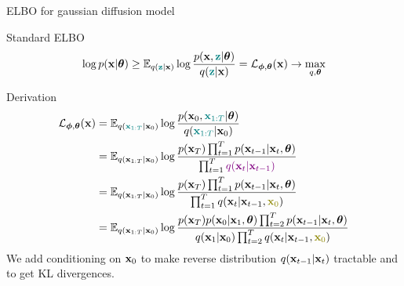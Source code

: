 \begin{frame}{ELBO for gaussian diffusion model}
	\begin{block}{Standard ELBO}
		\vspace{-0.4cm}
		\[
			\log p(\mathbf{x} | \boldsymbol{\theta}) \geq \mathbb{E}_{q({\color{teal}\mathbf{z}} | \mathbf{x})} \log \frac{p(\mathbf{x}, {\color{teal}\mathbf{z}} | \boldsymbol{\theta})}{q({\color{teal}\mathbf{z}} | \mathbf{x})} = \mathcal{L}_{\boldsymbol{\phi}, \boldsymbol{\theta}}(\mathbf{x}) \rightarrow \max_{q, \boldsymbol{\theta}}
		\]
		\vspace{-0.5cm}
	\end{block}
	\begin{block}{Derivation}
		\vspace{-0.5cm}
		{\small
		\begin{align*}
			\cL_{\bphi, \btheta}(\bx) &= \bbE_{q({\color{teal}\bx_{1:T}} | \bx_0)} \log \frac{p(\bx_0, {\color{teal}\bx_{1:T}} | \btheta)}{q({\color{teal}\bx_{1:T}} | \bx_0)} \\
			& = \bbE_{q(\bx_{1:T} | \bx_0)} \log \frac{p(\bx_T) \prod_{t=1}^T p(\bx_{t-1} | \bx_t, \btheta) }{\prod_{t=1}^T {\color{violet}q(\bx_t | \bx_{t-1})}}  \\ 
			& = \bbE_{q(\bx_{1:T} | \bx_0)} \log \frac{p(\bx_T) \prod_{t=1}^T p(\bx_{t-1} | \bx_t, \btheta) }{\prod_{t=1}^T q(\bx_t | \bx_{t-1}, {\color{olive}\bx_0})}  \\ 
			& = \bbE_{q(\bx_{1:T} | \bx_0)} \log \frac{p(\bx_T) p(\bx_0 | \bx_1, \btheta) \prod_{t=2}^T p(\bx_{t-1} | \bx_t, \btheta) }{q(\bx_1 | \bx_0)\prod_{t=2}^T q(\bx_t | \bx_{t-1}, {\color{olive}\bx_0})} 
		\end{align*}}
		We add conditioning on $\mathbf{x}_0$ to make reverse distribution $q(\mathbf{x}_{t - 1} | \mathbf{x}_t)$ tractable and to get KL divergences.
	\end{block}
	
\end{frame}
